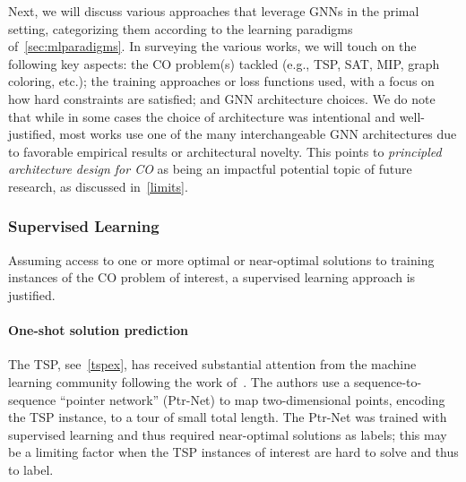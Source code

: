 \documentclass[twoside,11pt]{article}
\begin{document}
Next, we will discuss various approaches that leverage GNNs in the primal setting, categorizing them according to the learning paradigms of~\cref{sec:mlparadigms}. In surveying the various works, we will touch on the following key aspects: the CO problem(s) tackled (e.g., TSP, SAT, MIP, graph coloring, etc.); the training approaches or loss functions used, with a focus on how hard constraints are satisfied; and GNN architecture choices. We do note that while in some cases the choice of architecture was intentional and well-justified, most works use one of the many interchangeable GNN architectures due to favorable empirical results or architectural novelty. This points to \textit{principled architecture design for CO} as being an impactful potential topic of future research, as discussed in~\cref{limits}.

\subsubsection{Supervised Learning}\label{subsub:lhs}
Assuming access to one or more optimal or near-optimal solutions to training instances of the CO problem of interest, a supervised learning approach is justified. 
\paragraph{One-shot solution prediction} The TSP, see~\cref{tspex}, has received substantial attention from the machine learning community following the work of~\citet{Vinyals2015}. The authors use a sequence-to-sequence ``pointer network'' (Ptr-Net) to map two-dimensional points, encoding the TSP instance, to a tour of small total length. The Ptr-Net was trained with supervised learning and thus required near-optimal solutions as labels; this may be a limiting factor when the TSP instances of interest are hard to solve and thus to label. 
\end{document}
